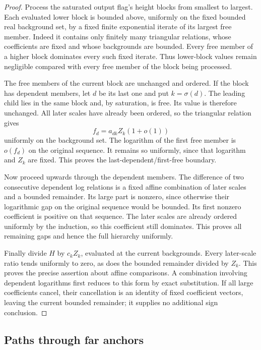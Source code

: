 \begin{proof}
Process the saturated output flag's height blocks from smallest to
largest. Each evaluated lower block is bounded above, uniformly on the fixed bounded real background set,
by a fixed finite exponential iterate of its largest free member.
Indeed it contains only finitely many triangular relations, whose
coefficients are fixed and whose backgrounds are bounded. Every free
member of a higher block dominates every such fixed iterate. Thus
lower-block values remain negligible compared with every free member
of the block being processed.

The free members of the current block are unchanged and ordered. If
the block has dependent members, let $d$ be its last one and put
$k=\sigma(d)$. The leading child lies in the same block and, by
saturation, is free. Its value is therefore unchanged. All later
scales have already been ordered, so the triangular relation gives
\[
 f_d=a_{dk}Z_k(1+o(1))
\]
uniformly on the background set. The logarithm of the first free
member is $o(f_d)$ on the original sequence. It remains so uniformly,
since that logarithm and $Z_k$ are fixed. This proves the
last-dependent/first-free boundary.

Now proceed upwards through the dependent members. The difference
of two consecutive dependent log relations is a fixed affine
combination of later scales and a bounded remainder. Its large part
is nonzero, since otherwise their logarithmic gap on the original
sequence would be bounded. Its first nonzero coefficient is positive
on that sequence. The later scales are already ordered uniformly by
the induction, so this coefficient still dominates. This proves all
remaining gaps and hence the full hierarchy uniformly.

Finally divide $H$ by $c_kZ_k$, evaluated at the current backgrounds.
Every later-scale ratio tends uniformly to zero, as does the bounded
remainder divided by $Z_k$. This proves the precise assertion about
affine comparisons. A combination involving dependent logarithms
first reduces to this form by exact substitution. If all large
coefficients cancel, their cancellation is an identity of fixed
coefficient vectors, leaving the current bounded remainder; it
supplies no additional sign conclusion.
\end{proof}

\subsection{Paths through far anchors}

